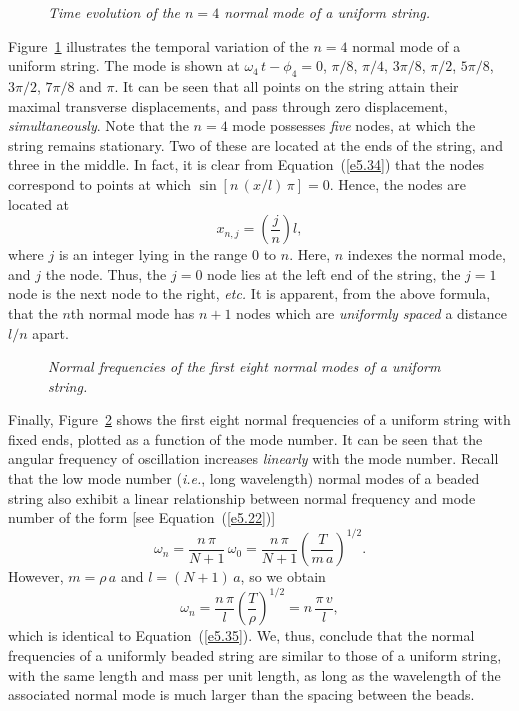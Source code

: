 \begin{figure}
\epsfysize=3in
\centerline{}
\caption{\em Time evolution of the $n=4$ normal mode of a uniform string.}\label{f5.7}   
\end{figure}

Figure~\ref{f5.7}  illustrates the temporal variation of the $n=4$ normal mode of
a uniform string. The mode is shown at $\omega_4\,t-\phi_4=0$, $\pi/8$, $\pi/4$, $3\pi/8$, $\pi/2$, $5\pi/8$, $3\pi/2$, $7\pi/8$ and $\pi$. It can be seen
that all points on the string attain their maximal
transverse displacements, and pass through zero displacement, {\em simultaneously}. 
Note that the $n=4$ mode possesses {\em five}\/ nodes, at which the string remains stationary. Two of these
are located at the ends of the string, and three  in the middle. In fact, it is
clear from Equation~(\ref{e5.34}) that the nodes correspond to points at which
$\sin [n\,(x/l)\,\pi]=0$. Hence, the nodes are located at
\begin{equation}
x_{n,j} = \left(\frac{j}{n}\right)l,
\end{equation}
where $j$ is an integer lying in the range $0$ to $n$. Here, $n$ indexes the normal mode,
and $j$ the node. Thus, the $j=0$ node lies at the left end of the string, the
$j=1$ node is the next node to the right, {\em etc.} It is apparent,  from the above
formula, that the $n$th normal mode has $n+1$ nodes which are {\em uniformly
spaced}\/ a distance $l/n$ apart.

\begin{figure}
\epsfysize=3in
\centerline{}
\caption{\em Normal frequencies of the first eight normal modes of a uniform string.}\label{f5.8}   
\end{figure}

Finally, Figure~\ref{f5.8} shows the first eight normal frequencies  of a uniform string  with fixed ends, plotted  as a function of the mode number. 
It can be seen that the angular frequency  of oscillation increases {\em linearly}\/
with the mode number.  Recall that the low mode number ({\em i.e.}, long wavelength)
normal modes of a beaded string also exhibit a linear relationship between normal
frequency and mode number of the form [see Equation~(\ref{e5.22})]
\begin{equation}
\omega_n = \frac{n\,\pi}{N+1}\,\omega_0= \frac{n\,\pi}{N+1}\left(\frac{T}{m\,a}\right)^{1/2}.
\end{equation}
However, $m=\rho\,a$ and $l=(N+1)\,a$, so we obtain
\begin{equation}
\omega_n = \frac{n\,\pi}{l}\left(\frac{T}{\rho}\right)^{1/2} =n\, \frac{\pi\,v}{l},
\end{equation}
which is identical to Equation~(\ref{e5.35}). We, thus, conclude that the normal
frequencies of a uniformly beaded string are similar to those of a  uniform
string, with the same length and mass per unit length, as long as the wavelength of the associated normal mode is much larger than the spacing
between the beads.

